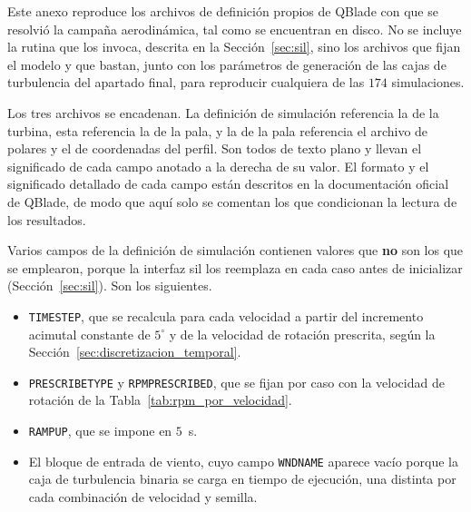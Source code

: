 
Este anexo reproduce los archivos de definición propios de QBlade con que se resolvió
la campaña aerodinámica, tal como se encuentran en disco. No se incluye la rutina que
los invoca, descrita en la Sección~\ref{sec:sil}, sino los archivos que fijan el modelo
y que bastan, junto con los parámetros de generación de las cajas de turbulencia del
apartado final, para reproducir cualquiera de las $174$ simulaciones.

Los tres archivos se encadenan. La definición de simulación referencia la de la turbina,
esta referencia la de la pala, y la de la pala referencia el archivo de polares y el de
coordenadas del perfil. Son todos de texto plano y llevan el significado de cada campo
anotado a la derecha de su valor. El formato y el significado detallado de cada campo
están descritos en la documentación oficial de QBlade, de modo que aquí solo se comentan
los que condicionan la lectura de los resultados.

Varios campos de la definición de simulación contienen valores que \textbf{no} son los
que se emplearon, porque la interfaz \gls{sil} los reemplaza en cada caso antes de
inicializar (Sección~\ref{sec:sil}). Son los siguientes.

\begin{itemize}
    \item \texttt{TIMESTEP}, que se recalcula para cada velocidad a partir del
          incremento acimutal constante de $5^\circ$ y de la velocidad de rotación
          prescrita, según la Sección~\ref{sec:discretizacion_temporal}.
    \item \texttt{PRESCRIBETYPE} y \texttt{RPMPRESCRIBED}, que se fijan por caso con la
          velocidad de rotación de la Tabla~\ref{tab:rpm_por_velocidad}.
    \item \texttt{RAMPUP}, que se impone en $5$~s.
    \item El bloque de entrada de viento, cuyo campo \texttt{WNDNAME} aparece vacío
          porque la caja de turbulencia binaria se carga en tiempo de ejecución, una
          distinta por cada combinación de velocidad y semilla.
\end{itemize}

